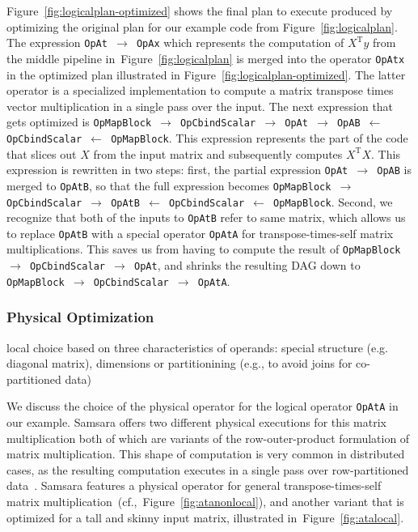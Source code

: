 \documentclass{article}
\begin{document}
Figure~\ref{fig:logicalplan-optimized} shows the final plan to execute produced by optimizing the original plan for our example code from Figure~\ref{fig:logicalplan}. The expression \texttt{OpAt $\rightarrow$ OpAx} which represents the computation of $X^\mathrm{T}y$ from the middle pipeline in~Figure~\ref{fig:logicalplan} is merged into the operator \texttt{OpAtx} in the optimized plan illustrated in Figure~\ref{fig:logicalplan-optimized}. The latter operator is a specialized implementation to compute a matrix transpose times vector multiplication in a single pass over the input. The next expression that gets optimized is \texttt{OpMapBlock $\rightarrow$ OpCbindScalar $\rightarrow$ OpAt $\rightarrow$ OpAB $\leftarrow$ OpCbindScalar $\leftarrow$ OpMapBlock}. This expression represents the part of the code that slices out $X$ from the input matrix and subsequently computes $X^\mathrm{T}X$. This expression is rewritten in two steps: first, the partial expression \texttt{OpAt $\rightarrow$ OpAB} is merged to \texttt{OpAtB}, so that the full expression becomes \texttt{OpMapBlock $\rightarrow$ OpCbindScalar $\rightarrow$ OpAtB $\leftarrow$ OpCbindScalar $\leftarrow$ OpMapBlock}. Second, we recognize that both of the inputs to \texttt{OpAtB} refer to same matrix, which allows us to replace \texttt{OpAtB} with a special operator \texttt{OpAtA} for transpose-times-self matrix multiplications. This saves us from having to compute the result of \texttt{OpMapBlock $\rightarrow$ OpCbindScalar $\rightarrow$ OpAt}, and shrinks the resulting DAG down to \texttt{OpMapBlock $\rightarrow$ OpCbindScalar $\rightarrow$ OpAtA}.

\subsubsection{Physical Optimization}

local choice based on three characteristics of operands: special structure (e.g. diagonal matrix), dimensions or partitionining (e.g., to avoid joins for co-partitioned data)

We discuss the choice of the physical operator for the logical operator \texttt{OpAtA} in our example. Samsara offers two different physical executions for this matrix multiplication both of which are variants of the row-outer-product formulation of matrix multiplication. This shape of computation is very common in distributed cases, as the resulting computation executes in a single pass over row-partitioned data~\cite{Schelter2012}. Samsara features a physical operator for general transpose-times-self matrix multiplication~(cf.,~Figure~\ref{fig:atanonlocal}), and another variant that is optimized for a tall and skinny input matrix, illustrated in~Figure~\ref{fig:atalocal}.
\end{document}
